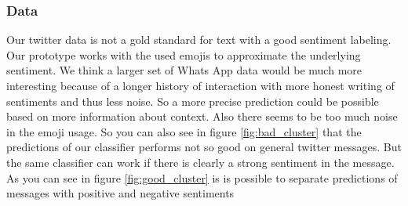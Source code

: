 \documentclass{article}
\begin{document}
\subsubsection{Data}
Our twitter data is not a gold standard for text with a good sentiment labeling. Our prototype works with the used emojis to approximate the underlying sentiment. We think a larger set of Whats App data would be much more interesting because of a longer history of interaction with more honest writing of sentiments and thus less noise. So a more precise prediction could be possible based on more information about context. Also there seems to be too much noise in the emoji usage. So you can also see in figure \ref{fig:bad_cluster} that the predictions of our classifier performs not so good on general twitter messages. But the same classifier can work if there is clearly a strong sentiment in the message. As you can see in figure \ref{fig:good_cluster} is is possible to separate predictions of messages with positive and negative sentiments
\end{document}
